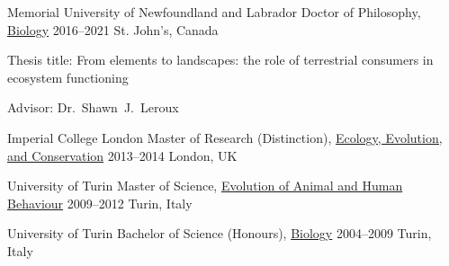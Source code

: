

\begin{cventries}

  \cventry
    {Memorial University of Newfoundland and Labrador} %
    {Doctor of Philosophy, \href{http://www.mun.ca/biology}{Biology}} %
    {2016--2021} %
    {St. John's, Canada} %
    {
      \begin{cvitems} %
        \item {Thesis title: From elements to landscapes: the role of terrestrial consumers in ecosystem functioning}
        \item {Advisor: Dr.~Shawn~J.~Leroux}
      \end{cvitems}
    }

  \cventry
    {Imperial College London} %
    {Master of Research (Distinction), \href{https://www.imperial.ac.uk/study/pg/life-sciences/ecology-evolution-conservation-research/}{Ecology, Evolution, and Conservation}} %
    {2013--2014} %
    {London, UK} %
    {}
  
  \cventry
    {University of Turin} %
    {Master of Science, \href{https://goo.gl/rCzbq7}{Evolution of Animal and Human Behaviour}} %
    {2009--2012} %
    {Turin, Italy} %
    {}
  
  \cventry
    {University of Turin} %
    {Bachelor of Science (Honours), \href{http://biologia.campusnet.unito.it/do/home.pl}{Biology}} %
    {2004--2009} %
    {Turin, Italy} %
    {}
\end{cventries}
